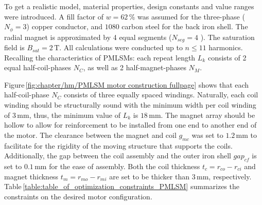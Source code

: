             
            To get a realistic model, material properties, design constants and value ranges were introduced. A fill factor of $w = 62\,\%$ was assumed for the three-phase ($N_{\phi}=3$) copper conductor, and $1080$ carbon steel for the back iron shell. The radial magnet is approximated by 4 equal segments ($N_{seg}=4$ ). The saturation field is $B_{sat}=2\,\mathrm{T}$. All calculations were conducted up to $n \leq 11$ harmonics. Recalling the characteristics of \acsp{PMLSM}: each repeat length $L_{k}$ consists of 2 equal half-coil-phases $N_C$, as well as 2 half-magnet-phases $N_M$. 
            
            
            Figure\,\ref{fig:chapter/hm/PMLSM motor construction fullpage} shows that each half-coil-phase $N_C$ consists of three equally spaced windings. Naturally, each coil winding should be structurally sound with the minimum width per coil winding of $3\,\mathrm{mm}$, thus, the minimum value of $L_k$ is $18\,\mathrm{mm}$. The magnet array should be hollow to allow for reinforcement to be installed from one end to another end of the motor. The clearance between the magnet and coil $g_{mc}$ was set to $1.2\,\mathrm{mm}$ to facilitate for the rigidity of the moving structure that supports the coils. Additionally, the gap between the coil assembly and the outer iron shell $gap_{cf}$ is set to $0.1\,\mathrm{mm}$ for the ease of assembly. Both the coil thickness $t_c = r_{co}-r_{ci}$ and magnet thickness $t_m = r_{mo}-r_{mi}$ are set to be thicker than $3\,\mathrm{mm}$, respectively. Table\,\ref{table:table_of_optimization_constraints_PMLSM} summarizes the constraints on the desired motor configuration.
            
